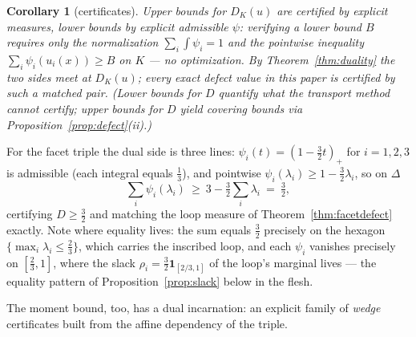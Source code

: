 \documentclass[11pt,reqno]{amsart}
\theoremstyle{plain}
\newtheorem{corollary}[theorem]{Corollary}
\theoremstyle{definition}
\theoremstyle{remark}
\begin{document}
\begin{corollary}[certificates]\label{cor:certificates}
Upper bounds for $D_K(u)$ are certified by explicit measures, lower bounds by
explicit admissible $\psi$: verifying a lower bound $B$ requires only the
normalization $\sum_i\int\psi_i=1$ and the pointwise inequality
$\sum_i\psi_i(u_i(x))\ge B$ on $K$ --- no optimization. By
Theorem~\ref{thm:duality} the two sides meet at $D_K(u)$; every exact defect
value in this paper is certified by such a matched pair. (Lower bounds for
$D$ quantify what the transport method \emph{cannot} certify; upper bounds
for $D$ yield covering bounds via Proposition~\ref{prop:defect}(ii).)
\end{corollary}

For the facet triple the dual side is three lines:
$\psi_i(t)=(1-\tfrac32t)_+$ for $i=1,2,3$ is admissible (each integral equals
$\tfrac13$), and pointwise $\psi_i(\lambda_i)\ge1-\tfrac32\lambda_i$, so on
$\Delta$
\[
\textstyle\sum_i\psi_i(\lambda_i)\ \ge\ 3-\tfrac32\sum_i\lambda_i\ =\
\tfrac32 ,
\]
certifying $D\ge\tfrac32$ and matching the loop measure of
Theorem~\ref{thm:facetdefect} exactly. Note where equality lives: the sum
equals $\tfrac32$ precisely on the hexagon
$\{\max_i\lambda_i\le\tfrac23\}$, which carries the inscribed loop, and each
$\psi_i$ vanishes precisely on $[\tfrac23,1]$, where the slack
$\rho_i=\tfrac32\mathbf1_{[2/3,1]}$ of the loop's marginal lives --- the
equality pattern of Proposition~\ref{prop:slack} below in the flesh.

The moment bound, too, has a dual incarnation: an explicit family of
\emph{wedge} certificates built from the affine dependency of the triple.
\end{document}
